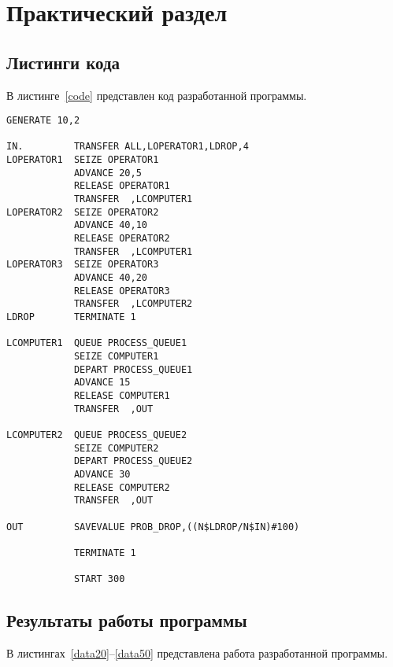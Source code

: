\chapter{Практический раздел}

\section{Листинги кода}

В листинге~\ref{code} представлен код разработанной программы.

\begin{lstlisting}[label=code,caption=Код программы на языке GPSS]
            GENERATE 10,2

IN.         TRANSFER ALL,LOPERATOR1,LDROP,4
LOPERATOR1  SEIZE OPERATOR1
            ADVANCE 20,5
            RELEASE OPERATOR1
            TRANSFER  ,LCOMPUTER1
LOPERATOR2  SEIZE OPERATOR2
            ADVANCE 40,10
            RELEASE OPERATOR2
            TRANSFER  ,LCOMPUTER1
LOPERATOR3 	SEIZE OPERATOR3
            ADVANCE 40,20
            RELEASE OPERATOR3
            TRANSFER  ,LCOMPUTER2
LDROP       TERMINATE 1

LCOMPUTER1  QUEUE PROCESS_QUEUE1
            SEIZE COMPUTER1
            DEPART PROCESS_QUEUE1
            ADVANCE 15
            RELEASE COMPUTER1
            TRANSFER  ,OUT

LCOMPUTER2 	QUEUE PROCESS_QUEUE2
            SEIZE COMPUTER2
            DEPART PROCESS_QUEUE2
            ADVANCE 30
            RELEASE COMPUTER2
            TRANSFER  ,OUT

OUT         SAVEVALUE PROB_DROP,((N$LDROP/N$IN)#100)

            TERMINATE 1

            START 300
\end{lstlisting}

\section{Результаты работы программы}

В листингах~\ref{data20}--\ref{data50} представлена работа разработанной программы.


